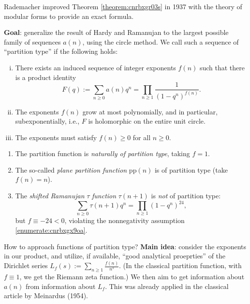\documentclass[reqno]{amsart} 
\numberwithin{theorem}{section}
\numberwithin{equation}{section}
\begin{document}
\begin{remark}
  Rademacher improved Theorem \ref{theorem:cnrbxgr03s} in 1937 with the theory of modular forms to provide an exact formula.
\end{remark}

\textbf{Goal}: generalize the result of Hardy and Ramanujan to the largest possible family of sequences $a(n)$, using the circle method.  We call such a sequence of ``partition type'' if the following holds:
\begin{enumerate}[(i)]
\item\label{enumerate:cnrbxgyeoc} There exists an induced sequence of integer exponents $f(n)$ such that there is a product identity
  \begin{equation*}
    F(q) := \sum_{n \geq 0} a(n) q^n = \prod_{n \geq 1}
    \frac{1}{(1 - q^n)^{f(n)}}.
  \end{equation*}
\item\label{enumerate:cnrbxgyhfl} The exponents $f(n)$ grow at most polynomially, and in particular, subexponentially, i.e., $F$ is holomorphic on the entire unit circle.
\item\label{enumerate:cnrbxgx9oa} The exponents must satisfy $f(n) \geq 0$ for all $n \geq 0$.
\end{enumerate}

\begin{example}
  \begin{enumerate}
  \item The partition function is \emph{naturally of partition type}, taking $f = 1$.
  \item The so-called \emph{plane partition function } $\mathrm{pp}(n)$ is of partition type (take $f(n) = n$).
  \item The \emph{shifted Ramanujan} $\tau$ \emph{function} $\tau(n + 1)$ is \emph{not} of partition type:
    \begin{equation*}
      \sum_{n \geq 0} \tau(n + 1) q^n =
      \prod_{n \geq 1}(1 - q^n)^{24},
    \end{equation*}
    but $f \equiv - 24 < 0$, violating the nonnegativity assumption \eqref{enumerate:cnrbxgx9oa}.
  \end{enumerate}
\end{example}
How to approach functions of partition type?  \textbf{Main idea}: consider the exponents in our product, and utilize, if available, ``good analytical proeprties'' of the Dirichlet series $L_f(s) := \sum_{n \geq 1} \frac{f(n)}{ n^s}$.  (In the classical partition function, with $f \equiv 1$, we get the Riemann zeta function.)  We then aim to get information about $a(n)$ from information about $L_f$.  This was already applied in the classical article by Meinardus (1954).
\end{document}
